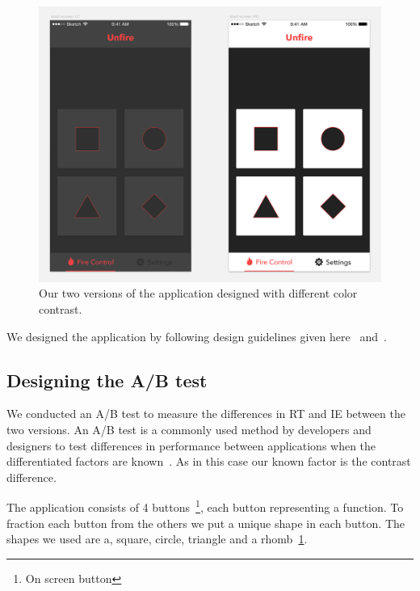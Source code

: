 \documentclass[runningheads,a4paper]{llncs}
\begin{document}
\begin{figure}
	\centering
	\includegraphics[width=\textwidth]{application}
	\caption{Our two versions of the application designed with different color contrast.\label{fig:application}}
\end{figure}

We designed the application by following design guidelines given here~\cite{hoober2011designing} and~\cite{johnson2013designing}. 

\subsection{Designing the A/B test}
We conducted an A/B test to measure the differences in RT and IE between the two versions. An A/B test is a commonly used method by developers and designers to test differences in performance between applications when the differentiated factors are known~\cite{johnson2013designing}. As in this case our known factor is the contrast difference. 

The application consists of 4 buttons~\footnote{On screen button}, each button representing a function. To fraction each button from the others we put a unique shape in each button. The shapes we used are a, square, circle, triangle and a rhomb~\ref{fig:application}.
\end{document}
